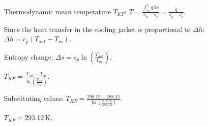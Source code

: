 Thermodynamic mean temperature \( T_{KF} \):  
\( T = \frac{\int_{s_a}^{s_e} \dot{q} \, \text{d}s}{s_a - s_e} = \frac{\dot{q}}{s_a - s_e} \).  

Since the heat transfer in the cooling jacket is proportional to \( \Delta h \):  
\( \Delta h = c_p (T_{out} - T_{in}) \).  

Entropy change:  
\( \Delta s = c_p \ln \left( \frac{T_{out}}{T_{in}} \right) \).  

\( T_{KF} = \frac{T_{out} - T_{in}}{\ln \left( \frac{T_{out}}{T_{in}} \right)} \).  

Substituting values:  
\( T_{KF} = \frac{298.15 - 288.15}{\ln \left( \frac{298.15}{288.15} \right)} \).  

\( T_{KF} = 293.12 \, \text{K} \).